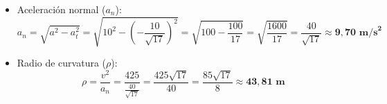 \documentclass[11pt,a4paper]{article}
\begin{document}
\begin{itemize}[leftmargin=1.5em, itemsep=3pt]
\begin{itemize}[leftmargin=1.5em, itemsep=2pt]
\[        \]
        *(Signo negativo porque el cuerpo asciende frenándose)*.
        \item Aceleración normal ($a_n$):
        \[
        a_n = \sqrt{a^2 - a_t^2} = \sqrt{10^2 - \left(-\frac{10}{\sqrt{17}}\right)^2} = \sqrt{100 - \frac{100}{17}} = \sqrt{\frac{1600}{17}} = \frac{40}{\sqrt{17}} \approx \mathbf{9{,}70\text{ m/s}^2}
        \]
        \item Radio de curvatura ($\rho$):
        \[
        \rho = \frac{v^2}{a_n} = \frac{425}{\frac{40}{\sqrt{17}}} = \frac{425\sqrt{17}}{40} = \frac{85\sqrt{17}}{8} \approx \mathbf{43{,}81\text{ m}}
        \]
    \end{itemize}
\end{itemize}
\end{document}
